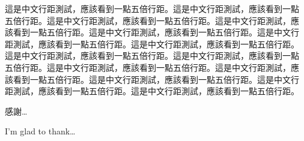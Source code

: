 \begin{acknowledgementszh}
這是中文行距測試，應該看到一點五倍行距。這是中文行距測試，應該看到一點
五倍行距。這是中文行距測試，應該看到一點五倍行距。這是中文行距測試，應
該看到一點五倍行距。這是中文行距測試，應該看到一點五倍行距。這是中文行
距測試，應該看到一點五倍行距。這是中文行距測試，應該看到一點五倍行距。
這是中文行距測試，應該看到一點五倍行距。這是中文行距測試，應該看到一點
五倍行距。這是中文行距測試，應該看到一點五倍行距。這是中文行距測試，應
該看到一點五倍行距。這是中文行距測試，應該看到一點五倍行距。這是中文行
距測試，應該看到一點五倍行距。這是中文行距測試，應該看到一點五倍行距。

感謝\ldots
\end{acknowledgementszh}

\begin{acknowledgementsen}


I'm glad to thank\ldots 
\end{acknowledgementsen}
